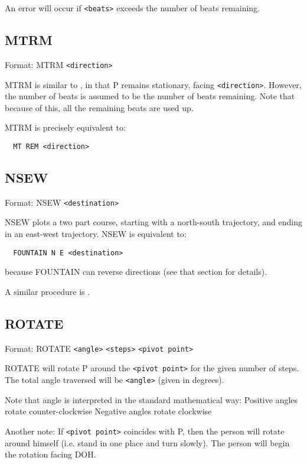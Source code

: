 An error will occur if \verb$<beats>$ exceeds the number of beats remaining.

\subsection{MTRM}\label{mtrm}

Format: MTRM \verb$<direction>$

MTRM is similar to , in that P remains stationary,
facing \verb$<direction>$.  However, the number of beats is assumed to
be the number of beats remaining.  Note that because of this, all the
remaining beats are used up.

MTRM is precisely equivalent to:
\begin{verbatim}
  MT REM <direction>
\end{verbatim}

\subsection{NSEW}\label{nsew}

Format: NSEW \verb$<destination>$

NSEW plots a two part course, starting with a north-south trajectory, and
ending in an east-west trajectory.  NSEW is equivalent to:
\begin{verbatim}
  FOUNTAIN N E <destination>
\end{verbatim}
because FOUNTAIN can reverse directions (see that section for details).

A similar procedure is .

\subsection{ROTATE}\label{rotate}

Format: ROTATE \verb$<angle>$ \verb$<steps>$ \verb$<pivot point>$

ROTATE will rotate P around the \verb$<pivot point>$ for the given
number of steps.  The total angle traversed will be \verb$<angle>$ (given in
degrees).

Note that angle is interpreted in the standard mathematical way:
  Positive angles rotate counter-clockwise
  Negative angles rotate clockwise

Another note:  If \verb$<pivot point>$ coincides with P, then the person will
rotate around himself (i.e. stand in one place and turn slowly).  The
person will begin the rotation facing DOH.

